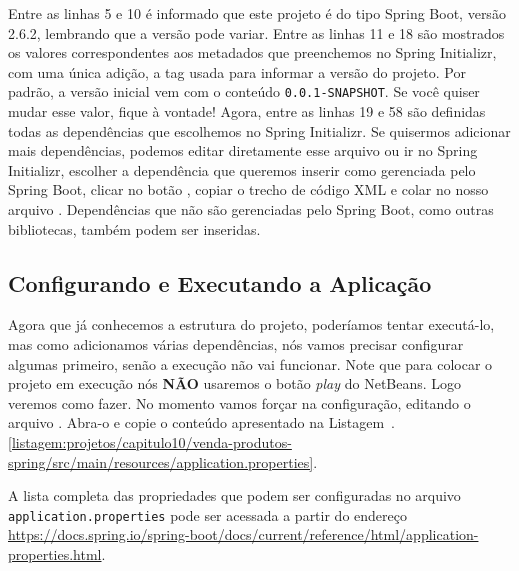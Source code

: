 Entre as linhas 5 e 10 é informado que este projeto é do tipo Spring Boot, versão 2.6.2, lembrando que a versão pode variar. Entre as linhas 11 e 18 são mostrados os valores correspondentes aos metadados que preenchemos no Spring Initializr, com uma única adição, a tag  usada para informar a versão do projeto. Por padrão, a versão inicial vem com o conteúdo \texttt{0.0.1-SNAPSHOT}. Se você quiser mudar esse valor, fique à vontade! Agora, entre as linhas 19 e 58 são definidas todas as dependências que escolhemos no Spring Initializr. Se quisermos adicionar mais dependências, podemos editar diretamente esse arquivo ou ir no Spring Initializr, escolher a dependência que queremos inserir como gerenciada pelo Spring Boot, clicar no botão , copiar o trecho de código XML e colar no nosso arquivo . Dependências que não são gerenciadas pelo Spring Boot, como outras bibliotecas, também podem ser inseridas.


\subsection{Configurando e Executando a Aplicação}

Agora que já conhecemos a estrutura do projeto, poderíamos tentar executá-lo, mas como adicionamos várias dependências, nós vamos precisar configurar algumas primeiro, senão a execução não vai funcionar. Note que para colocar o projeto em execução nós \textbf{NÃO} usaremos o botão \textit{play} do NetBeans. Logo veremos como fazer. No momento vamos forçar na configuração, editando o arquivo . Abra-o e copie o conteúdo apresentado na Listagem~\thechapter.\ref{listagem:projetos/capitulo10/venda-produtos-spring/src/main/resources/application.properties}.


\begin{saibaMais}
    A lista completa das propriedades que podem ser configuradas no arquivo \texttt{application.properties} pode ser acessada a partir do endereço  \url{https://docs.spring.io/spring-boot/docs/current/reference/html/application-properties.html}.
\end{saibaMais}

